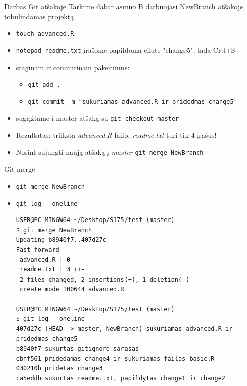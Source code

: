 \documentclass[11pt,xcolor=table]{beamer}
\begin{document}
\begin{frame}{Darbas Git atšakoje}
Tarkime dabar asmuo B darbuojasi NewBranch atšakoje tobulindamas projektą
\begin{itemize}
\item \colorbox{listinggray}{\lstinline|touch advanced.R|}
\item \colorbox{listinggray}{\lstinline|notepad readme.txt|} įrašome papildomą eilutę "change5", tada Crtl+S
\item staginam ir commitinam pakeitimus:
\begin{itemize}
\item \colorbox{listinggray}{\lstinline|git add .|}
\item \colorbox{listinggray}{\lstinline|git commit -m "sukuriamas advanced.R ir pridedmas change5"|}
\end{itemize}
\item sugrįžtame į master atšaką su \colorbox{listinggray}{\lstinline|git checkout master|}
\item Rezultatas: trūksta \textit{advanced.R} failo, \textit{readme.txt} turi tik 4 įrašus!
\item Norint sujungti naują atšaką į \textit{master} \colorbox{listinggray}{\lstinline|git merge NewBranch|}
\end{itemize}
\end{frame}

\begin{frame}[fragile]{Git merge}
\begin{itemize}
\item \colorbox{listinggray}{\lstinline|git merge NewBranch|}
\item \colorbox{listinggray}{\lstinline|git log --oneline|}

\begin{lstlisting}
USER@PC MINGW64 ~/Desktop/S175/test (master)
$ git merge NewBranch
Updating b8940f7..407d27c
Fast-forward
 advanced.R | 0
 readme.txt | 3 ++-
 2 files changed, 2 insertions(+), 1 deletion(-)
 create mode 100644 advanced.R
 
USER@PC MINGW64 ~/Desktop/S175/test (master)
$ git log --oneline
407d27c (HEAD -> master, NewBranch) sukuriamas advanced.R ir pridedmas change5
b8940f7 sukurtas gitignore sarasas
ebff561 pridedamas change4 ir sukuriamas failas basic.R
030210b pridetas change3
ca5eddb sukurtas readme.txt, papildytas change1 ir change2

\end{lstlisting}
\end{itemize}
\end{frame}
\end{document}
